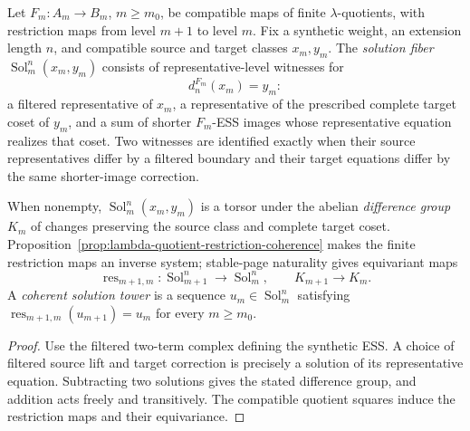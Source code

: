 \begin{definition}
  \label{def:synthetic-ess-solution-tower}
  \notready
  Let $F_m:A_m\to B_m$, $m\ge m_0$, be compatible maps of finite
  $\lambda$-quotients, with restriction maps from level $m+1$ to level $m$.
  Fix a synthetic weight, an extension length $n$, and compatible source and
  target classes $x_m,y_m$.  The \emph{solution fiber}
  $\operatorname{Sol}_m^n(x_m,y_m)$ consists of representative-level
  witnesses for
  \[
    d_n^{F_m}(x_m)=y_m:
  \]
  a filtered representative of $x_m$, a representative of the prescribed
  complete target coset of $y_m$, and a sum of shorter $F_m$-ESS images whose
  representative equation realizes that coset.  Two witnesses are identified
  exactly when their source representatives differ by a filtered boundary and
  their target equations differ by the same shorter-image correction.

  When nonempty, $\operatorname{Sol}_m^n(x_m,y_m)$ is a torsor under the
  abelian \emph{difference group} $K_m$ of changes preserving the source class
  and complete target coset.  Proposition~\ref{prop:lambda-quotient-restriction-coherence}
  makes the finite restriction maps an inverse system; stable-page naturality
  gives equivariant maps
  \[
    \operatorname{res}_{m+1,m}:\operatorname{Sol}_{m+1}^n
      \longrightarrow\operatorname{Sol}_m^n,
    \qquad K_{m+1}\longrightarrow K_m.
  \]
  A \emph{coherent solution tower} is a sequence
  $u_m\in\operatorname{Sol}_m^n$ satisfying
  $\operatorname{res}_{m+1,m}(u_{m+1})=u_m$ for every $m\ge m_0$.
\end{definition}

\begin{proof}
  Use the filtered two-term complex defining the synthetic ESS.  A choice of
  filtered source lift and target correction is precisely a solution of its
  representative equation.  Subtracting two solutions gives the stated
  difference group, and addition acts freely and transitively.  The compatible
  quotient squares induce the restriction maps and their equivariance.
\end{proof}

